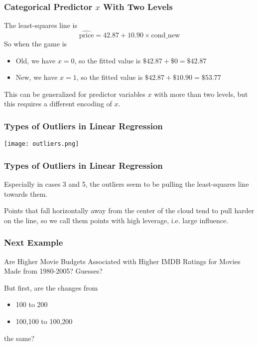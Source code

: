 \documentclass[slides]{beamer}
\newcommand{\blue}[1]{\textcolor{blue2}{#1}}
\begin{document}
\begin{frame}[fragile]
\frametitle{Categorical Predictor $x$ With Two Levels}
The least-squares line is
\[
\widehat{\mbox{price}} = 42.87 + 10.90 \times \mbox{cond\_new}
\]
\pause
So when the game is
\begin{itemize}
\item Old, we have $x=0$, so the fitted value is $\$42.87 + \$0 = \$42.87$
\item New, we have $x=1$, so the fitted value is $\$42.87 + \$10.90 = \$53.77$
\end{itemize}
\pause
This can be generalized for predictor variables $x$ with more than two levels, but this requires a different encoding of $x$.

\end{frame}


\begin{frame}[fragile]
\frametitle{Types of Outliers in Linear Regression}
\begin{center}
\texttt{[image: outliers.png]}
\end{center}
\end{frame}


\begin{frame}[fragile]
\frametitle{Types of Outliers in Linear Regression}
Especially in cases 3 and 5, the outliers seem to be pulling the least-squares line towards them.

\vspace{0.5cm}
\pause
Points that fall horizontally away from the center of the cloud tend to pull harder on the line, so we call them points with high \blue{leverage}, i.e. large influence.  

\end{frame}


\begin{frame}[fragile]
\frametitle{Next Example}

Are Higher Movie Budgets Associated with Higher IMDB Ratings for Movies Made from 1980-2005?  Guesses?

\vspace{0.5cm}

\pause But first, are the changes from
\begin{itemize}
\item 100 to 200
\item 100,100 to 100,200
\end{itemize}
the same?


\end{frame}
\end{document}
